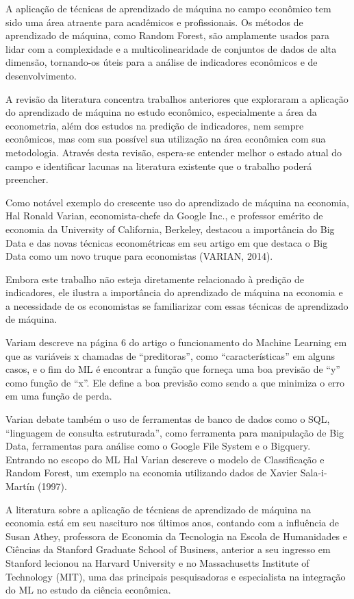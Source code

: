 \documentclass[
]{article}
\begin{document}
A aplicação de técnicas de aprendizado de máquina no campo econômico tem
sido uma área atraente para acadêmicos e profissionais. Os métodos de
aprendizado de máquina, como Random Forest, são amplamente usados para
lidar com a complexidade e a multicolinearidade de conjuntos de dados de
alta dimensão, tornando-os úteis para a análise de indicadores
econômicos e de desenvolvimento.

A revisão da literatura concentra trabalhos anteriores que exploraram a
aplicação do aprendizado de máquina no estudo econômico, especialmente a
área da econometria, além dos estudos na predição de indicadores, nem
sempre econômicos, mas com sua possível sua utilização na área econômica
com sua metodologia. Através desta revisão, espera-se entender melhor o
estado atual do campo e identificar lacunas na literatura existente que
o trabalho poderá preencher.

Como notável exemplo do crescente uso do aprendizado de máquina na
economia, Hal Ronald Varian, economista-chefe da Google Inc., e
professor emérito de economia da University of California, Berkeley,
destacou a importância do Big Data e das novas técnicas econométricas em
seu artigo em que destaca o Big Data como um novo truque para
economistas (VARIAN, 2014).

Embora este trabalho não esteja diretamente relacionado à predição de
indicadores, ele ilustra a importância do aprendizado de máquina na
economia e a necessidade de os economistas se familiarizar com essas
técnicas de aprendizado de máquina.

Variam descreve na página 6 do artigo o funcionamento do Machine
Learning em que as variáveis x chamadas de ``preditoras'', como
``características'' em alguns casos, e o fim do ML é encontrar a função
que forneça uma boa previsão de ``y'' como função de ``x''. Ele define a
boa previsão como sendo a que minimiza o erro em uma função de perda.

Varian debate também o uso de ferramentas de banco de dados como o SQL,
``linguagem de consulta estruturada'', como ferramenta para manipulação
de Big Data, ferramentas para análise como o Google File System e o
Bigquery. Entrando no escopo do ML Hal Varian descreve o modelo de
Classificação e Random Forest, um exemplo na economia utilizando dados
de Xavier Sala-i-Martín (1997).

A literatura sobre a aplicação de técnicas de aprendizado de máquina na
economia está em seu nascituro nos últimos anos, contando com a
influência de Susan Athey, professora de Economia da Tecnologia na
Escola de Humanidades e Ciências da Stanford Graduate School of
Business, anterior a seu ingresso em Stanford lecionou na Harvard
University e no Massachusetts Institute of Technology (MIT), uma das
principais pesquisadoras e especialista na integração do ML no estudo da
ciência econômica.
\end{document}
